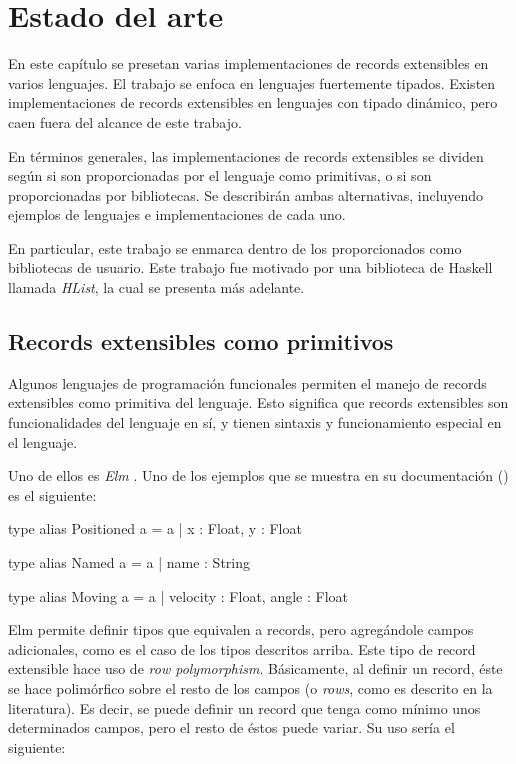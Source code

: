 
\chapter{Estado del arte}
\label{ch:2}
En este capítulo se presetan varias implementaciones de records extensibles en varios lenguajes. El trabajo se enfoca en lenguajes fuertemente tipados. Existen implementaciones de records extensibles en lenguajes con tipado dinámico, pero caen fuera del alcance de este trabajo.

En términos generales, las implementaciones de records extensibles se dividen según si son proporcionadas por el lenguaje como primitivas, o si son proporcionadas por bibliotecas. Se describirán ambas alternativas, incluyendo ejemplos de lenguajes e implementaciones de cada uno.

En particular, este trabajo se enmarca dentro de los proporcionados como bibliotecas de usuario. Este trabajo fue motivado por una biblioteca de Haskell llamada \textit{HList}, la cual se presenta más adelante.

\section{Records extensibles como primitivos}

Algunos lenguajes de programación funcionales permiten el manejo de records extensibles como primitiva del lenguaje. Esto significa que records extensibles son funcionalidades del lenguaje en sí, y tienen sintaxis y funcionamiento especial en el lenguaje.

Uno de ellos es \textit{Elm} \cite{Czaplicki:2013:AFR:2499370.2462161}. Uno de los ejemplos que se muestra en su documentación (\cite{ElmRecords}) es el siguiente:

\begin{code}
type alias Positioned a =
  { a | x : Float, y : Float }

type alias Named a =
  { a | name : String }

type alias Moving a =
  { a | velocity : Float, angle : Float }
\end{code}

Elm permite definir tipos que equivalen a records, pero agregándole campos adicionales, como es el caso de los tipos descritos arriba. Este tipo de record extensible hace uso de \textit{row polymorphism}. Básicamente, al definir un record, éste se hace polimórfico sobre el resto de los campos (o \textit{rows}, como es descrito en la literatura). Es decir, se puede definir un record que tenga como mínimo unos determinados campos, pero el resto de éstos puede variar. Su uso sería el siguiente:

